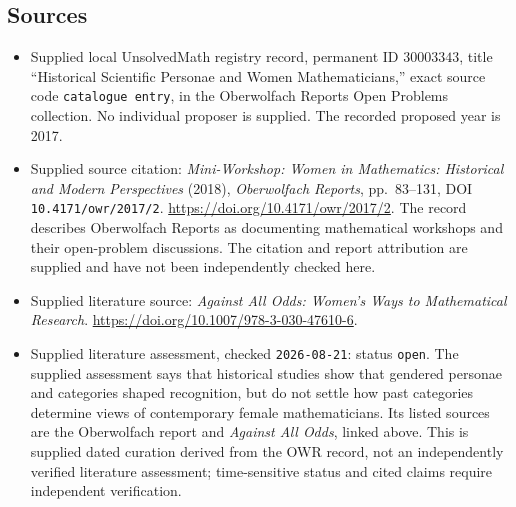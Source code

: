\documentclass[11pt]{article}
\begin{document}
\subsection{Sources}
\begin{itemize}
\item Supplied local UnsolvedMath registry record, permanent ID \(30003343\), title ``Historical Scientific Personae and Women Mathematicians,'' exact source code \texttt{catalogue entry}, in the Oberwolfach Reports Open Problems collection. No individual proposer is supplied. The recorded proposed year is 2017.
\item Supplied source citation: \emph{Mini-Workshop: Women in Mathematics: Historical and Modern Perspectives} (2018), \emph{Oberwolfach Reports}, pp.\ 83--131, DOI \texttt{10.4171/owr/2017/2}. \url{https://doi.org/10.4171/owr/2017/2}. The record describes Oberwolfach Reports as documenting mathematical workshops and their open-problem discussions. The citation and report attribution are supplied and have not been independently checked here.
\item Supplied literature source: \emph{Against All Odds: Women's Ways to Mathematical Research}. \url{https://doi.org/10.1007/978-3-030-47610-6}.
\item Supplied literature assessment, checked \texttt{2026-08-21}: status \texttt{open}. The supplied assessment says that historical studies show that gendered personae and categories shaped recognition, but do not settle how past categories determine views of contemporary female mathematicians. Its listed sources are the Oberwolfach report and \emph{Against All Odds}, linked above. This is supplied dated curation derived from the OWR record, not an independently verified literature assessment; time-sensitive status and cited claims require independent verification.
\end{itemize}
\end{document}
